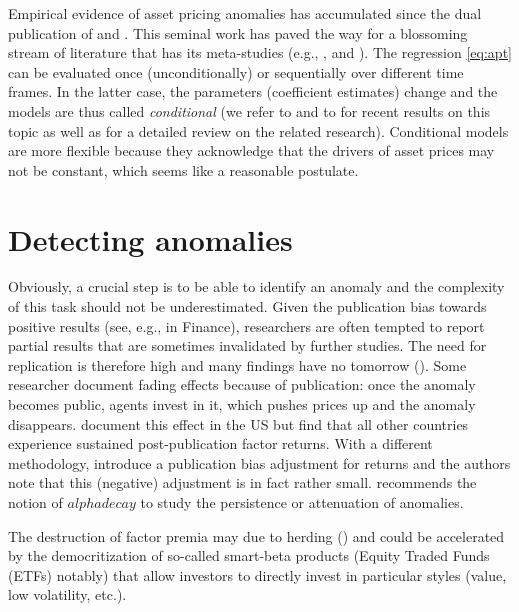 \documentclass[]{krantz}
\theoremstyle{definition}
\theoremstyle{definition}
\theoremstyle{definition}
\theoremstyle{remark}
\begin{document}
Empirical evidence of asset pricing anomalies has accumulated since the
dual publication of \citet{fama1992cross} and \citet{fama1993common}.
This seminal work has paved the way for a blossoming stream of
literature that has its meta-studies (e.g., \citet{green2013supraview},
\citet{harvey2016and} and \citet{mclean2016does}). The regression
\eqref{eq:apt} can be evaluated once (unconditionally) or sequentially
over different time frames. In the latter case, the parameters
(coefficient estimates) change and the models are thus called
\emph{conditional} (we refer to \citet{ang2012testing} and to
\citet{cooper2018new} for recent results on this topic as well as for a
detailed review on the related research). Conditional models are more
flexible because they acknowledge that the drivers of asset prices may
not be constant, which seems like a reasonable postulate.

\hypertarget{detecting-anomalies}{%
\section{Detecting anomalies}\label{detecting-anomalies}}

Obviously, a crucial step is to be able to identify an anomaly and the
complexity of this task should not be underestimated. Given the
publication bias towards positive results (see, e.g.,
\citet{harvey2017presidential} in Finance), researchers are often
tempted to report partial results that are sometimes invalidated by
further studies. The need for replication is therefore high and many
findings have no tomorrow (\citet{linnainmaa2018history}). Some
researcher document fading effects because of publication: once the
anomaly becomes public, agents invest in it, which pushes prices up and
the anomaly disappears. \citet{mclean2016does} document this effect in
the US but \citet{jacobs2019anomalies} find that all other countries
experience sustained post-publication factor returns. With a different
methodology, \citet{chen2019publication} introduce a publication bias
adjustment for returns and the authors note that this (negative)
adjustment is in fact rather small. \citet{penasse2018understanding}
recommends the notion of \(alpha decay\) to study the persistence or
attenuation of anomalies.

The destruction of factor premia may due to herding
(\citet{krkoska2019herding}) and could be accelerated by the
democritization of so-called smart-beta products (Equity Traded Funds
(ETFs) notably) that allow investors to directly invest in particular
styles (value, low volatility, etc.).
\end{document}
